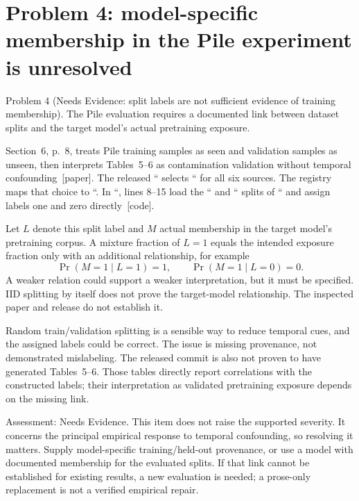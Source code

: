 \documentclass[10pt]{article}
\begin{document}
\section*{Problem 4: model-specific membership in the Pile experiment is unresolved}
Problem 4 (Needs Evidence: split labels are not sufficient evidence of training membership).  The Pile evaluation requires a documented link between dataset splits and the target model’s actual pretraining exposure.\par
Section 6, p. 8, treats Pile training samples as seen and validation samples as unseen, then interprets Tables 5–6 as contamination validation without temporal confounding [paper]. The released `` selects `` for all six sources. The registry maps that choice to ``. In ``, lines 8–15 load the `` and `` splits of `` and assign labels one and zero directly [code].\par
Let \(L\) denote this split label and \(M\) actual membership in the target model’s pretraining corpus. A mixture fraction of \(L=1\) equals the intended exposure fraction only with an additional relationship, for example \[\Pr(M=1\mid L=1)=1,\qquad
\Pr(M=1\mid L=0)=0.\] A weaker relation could support a weaker interpretation, but it must be specified. IID splitting by itself does not prove the target-model relationship. The inspected paper and release do not establish it.\par
Random train/validation splitting is a sensible way to reduce temporal cues, and the assigned labels could be correct. The issue is missing provenance, not demonstrated mislabeling. The released commit is also not proven to have generated Tables 5–6. Those tables directly report correlations with the constructed labels; their interpretation as validated pretraining exposure depends on the missing link.\par
Assessment: Needs Evidence. This item does not raise the supported severity. It concerns the principal empirical response to temporal confounding, so resolving it matters. Supply model-specific training/held-out provenance, or use a model with documented membership for the evaluated splits. If that link cannot be established for existing results, a new evaluation is needed; a prose-only replacement is not a verified empirical repair.\par
\end{document}
